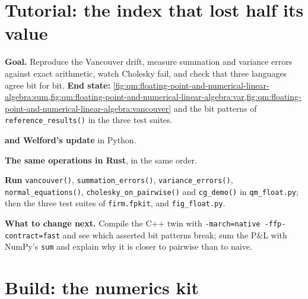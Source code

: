 \section{Tutorial: the index that lost half its value}\label{tut:qm:floating-point-and-numerical-linear-algebra:vancouver}

\begin{tutorial}
\textbf{Goal.} Reproduce the Vancouver drift, measure summation and variance errors against exact arithmetic, watch Cholesky fail, and check that three languages agree bit for bit.
\textbf{End state:} \cref{fig:qm:floating-point-and-numerical-linear-algebra:sum,fig:qm:floating-point-and-numerical-linear-algebra:var,fig:qm:floating-point-and-numerical-linear-algebra:vancouver}
and the bit patterns of \texttt{reference\_results()} in the three test suites.
\begin{tutsteps}
\item \textbf{ and Welford's update} in Python.
\label{lst:qm:floating-point-and-numerical-linear-algebra:py}
\item \textbf{The same operations in Rust}, in the same order.
\label{lst:qm:floating-point-and-numerical-linear-algebra:rs}
\item \textbf{Run} \texttt{vancouver()}, \texttt{summation\_errors()}, \texttt{variance\_errors()}, \texttt{normal\_equations()}, \texttt{cholesky\_on\_pairwise()} and \texttt{cg\_demo()} in
\texttt{qm\_float.py}; then the three test suites of \texttt{firm.fpkit}, and \texttt{fig\_float.py}.
\end{tutsteps}
\textbf{What to change next.} Compile the C++ twin with \texttt{-march=native -ffp-contract=fast} and see which asserted bit patterns break; sum the P\&L with NumPy's \texttt{sum} and explain why it
is closer to pairwise than to naive.
\end{tutorial}

\section{Build: the numerics kit}\label{bld:qm:floating-point-and-numerical-linear-algebra:fpkit}

